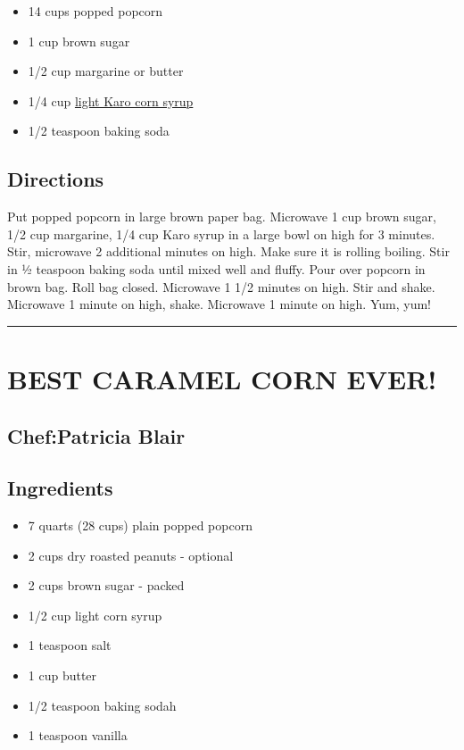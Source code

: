 \documentclass[
]{book}
\providecommand{\tightlist}{%
  \setlength{\itemsep}{0pt}\setlength{\parskip}{0pt}}
\begin{document}
\begin{itemize}
\tightlist
\item
  14 cups popped popcorn
\item
  1 cup brown sugar
\item
  1/2 cup margarine or butter
\item
  1/4 cup \href{https://en.wikipedia.org/wiki/Corn_syrup}{light Karo corn syrup}
\item
  1/2 teaspoon baking soda
\end{itemize}

\hypertarget{directions-99}{%
\subsection*{Directions}\label{directions-99}}


Put popped popcorn in large brown paper bag. Microwave 1 cup brown sugar, 1/2 cup margarine, 1/4 cup Karo syrup in a large bowl on high for 3 minutes. Stir, microwave 2 additional minutes on high. Make sure it is rolling boiling. Stir in ½ teaspoon baking soda until mixed well and fluffy. Pour over popcorn in brown bag. Roll bag closed. Microwave 1 1/2 minutes on high. Stir and shake. Microwave 1 minute on high, shake. Microwave 1 minute on high. Yum, yum!

\begin{center}\rule{0.5\linewidth}{0.5pt}\end{center}

\hypertarget{best-caramel-corn-ever}{%
\section*{BEST CARAMEL CORN EVER!}\label{best-caramel-corn-ever}}


\hypertarget{chefpatricia-blair}{%
\subsection*{Chef:Patricia Blair}\label{chefpatricia-blair}}


\hypertarget{ingredients-100}{%
\subsection*{Ingredients}\label{ingredients-100}}


\begin{itemize}
\tightlist
\item
  7 quarts (28 cups) plain popped popcorn
\item
  2 cups dry roasted peanuts - optional
\item
  2 cups brown sugar - packed
\item
  1/2 cup light corn syrup
\item
  1 teaspoon salt
\item
  1 cup butter
\item
  1/2 teaspoon baking sodah
\item
  1 teaspoon vanilla
\end{itemize}
\end{document}

